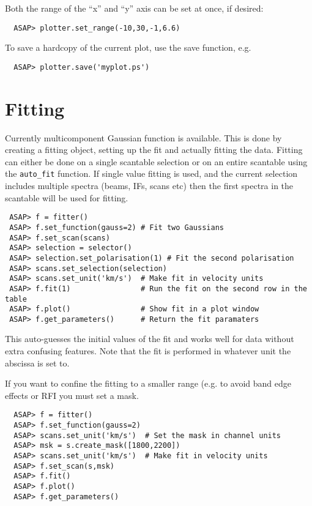 \documentclass[11pt]{article}
\newcommand{\cmd}[1]{{\tt #1}}
\begin{document}
Both the range of the ``x'' and ``y'' axis can be set at once, if desired:

\begin{verbatim}
  ASAP> plotter.set_range(-10,30,-1,6.6)
\end{verbatim}

To save a hardcopy of the current plot, use the save function, e.g.

\begin{verbatim}
  ASAP> plotter.save('myplot.ps')
\end{verbatim}

\section{Fitting}

Currently multicomponent Gaussian function is
available. This is done by creating a fitting object, setting up the
fit and actually fitting the data. Fitting can either be done on a
single scantable selection or on an entire scantable using the
\cmd{auto\_fit} function. If single value fitting is used, and the
current selection includes multiple spectra (beams, IFs, scans etc)
then the first spectra in the scantable will be used for fitting.

\begin{verbatim}
 ASAP> f = fitter()
 ASAP> f.set_function(gauss=2) # Fit two Gaussians
 ASAP> f.set_scan(scans)
 ASAP> selection = selector()
 ASAP> selection.set_polarisation(1) # Fit the second polarisation
 ASAP> scans.set_selection(selection)
 ASAP> scans.set_unit('km/s')  # Make fit in velocity units
 ASAP> f.fit(1)                # Run the fit on the second row in the table
 ASAP> f.plot()                # Show fit in a plot window
 ASAP> f.get_parameters()      # Return the fit paramaters
\end{verbatim}

This auto-guesses the initial values of the fit and works well for data
without extra confusing features. Note that the fit is performed in
whatever unit the abscissa is set to.

If you want to confine the fitting to a smaller range (e.g. to avoid
band edge effects or RFI you must set a mask.

\begin{verbatim}
  ASAP> f = fitter()
  ASAP> f.set_function(gauss=2)
  ASAP> scans.set_unit('km/s')  # Set the mask in channel units
  ASAP> msk = s.create_mask([1800,2200])
  ASAP> scans.set_unit('km/s')  # Make fit in velocity units
  ASAP> f.set_scan(s,msk)
  ASAP> f.fit()
  ASAP> f.plot()
  ASAP> f.get_parameters()
\end{verbatim}
\end{document}
